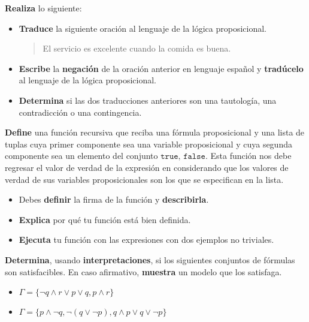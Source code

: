 \documentclass[oneside]{style}
\begin{document}
\begin{questions}[label=\protect\circled{\bfseries\arabic*}]
    \question
    {
        \textbf{Realiza} lo siguiente:
        \begin{itemize}
            \item \textbf{Traduce} la siguiente oración al lenguaje de la 
            lógica proposicional. 

            \begin{quote}
                \centering
                El servicio es excelente cuando la comida es buena. 
            \end{quote}

            \item \textbf{Escribe} la \textbf{negación} de la oración anterior 
            en lenguaje español y \textbf{tradúcelo} al lenguaje de la lógica 
            proposicional.

            \item \textbf{Determina} si las dos traducciones anteriores son 
            una tautología, una contradicción o una contingencia. 
        \end{itemize}
    }

    \question
    {
        \textbf{Define} una función recursiva que reciba una fórmula 
        proposicional y una lista de tuplas cuya primer componente sea una 
        variable proposicional y cuya segunda componente sea un elemento del 
        conjunto ${\texttt{true, false}}$. Esta función nos debe regresar el 
        valor de verdad de la expresión en  considerando que los valores de 
        verdad de sus variables proposicionales son los que se especifican 
        en la lista. 
        \begin{itemize}
            \item Debes \textbf{definir} la firma de la función y 
            \textbf{describirla}.

            \item \textbf{Explica} por qué tu función está bien definida. 

            \item \textbf{Ejecuta} tu función con las expresiones con dos 
            ejemplos no triviales. 
        \end{itemize}
    }

    \question
    {
        \textbf{Determina}, usando \textbf{interpretaciones}, si los siguientes 
        conjuntos de fórmulas son satisfacibles. En caso afirmativo, 
        \textbf{muestra} un modelo que los satisfaga.
        \begin{itemize}
            \item $\Gamma = \{\neg q \land r \lor p \lor q, p \land r\}$
            \item $\Gamma = \{p \land \neg q, \neg (q \lor \neg p), q \land p
            \lor q \lor \neg p\}$
        \end{itemize}
    }


\end{questions}
\end{document}
